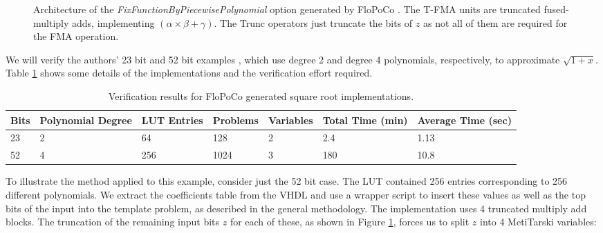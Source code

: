 \documentclass{fac}
\begin{document}
\begin{figure}
\centering

\caption{Architecture of the \textit{FixFunctionByPiecewisePolynomial} option generated by FloPoCo \cite{DinJolPas2010-poly}. The T-FMA units are truncated fused-multiply adds, implementing $(\alpha\times \beta + \gamma)$. The Trunc operators just truncate the bits of $z$ as not all of them are required for the FMA operation.\label{horner_arch}}
\end{figure}

We will verify the authors' 23 bit and 52 bit examples  \cite{DinJolPas2010-poly}, which use degree 2 and degree 4 polynomials, respectively, to approximate $\sqrt{1+x}$. Table \ref{flopo_results} shows some details of the implementations and the verification effort required. 

\begin{center}
\begin{table}
\begin{tabular}{lllllll}
\toprule
Bits & Polynomial Degree & LUT Entries & Problems & Variables & Total Time (min) & Average Time (sec)\\
\midrule
23 & 2 & 64 & 128 & 2 & 2.4 & 1.13 \\
52 & 4 & 256 & 1024 & 3 & 180 & 10.8\\
\bottomrule
\end{tabular}	
\caption{Verification results for FloPoCo generated square root implementations.}\label{flopo_results}     
\end{table}
\end{center}

To illustrate the method applied to this example, consider just the 52 bit case. The LUT contained 256 entries corresponding to 256 different polynomials. We extract the coefficients table from the VHDL and use a wrapper script to insert these values as well as the top bits of the input into the template problem, as described in the general methodology. The implementation uses 4 truncated multiply add blocks. The truncation of the remaining input bits $z$ for each of these, as shown in Figure \ref{horner_arch}, forces us to split $z$ into 4 MetiTarski variables:
\begin{center}
\end{center}
\end{document}
